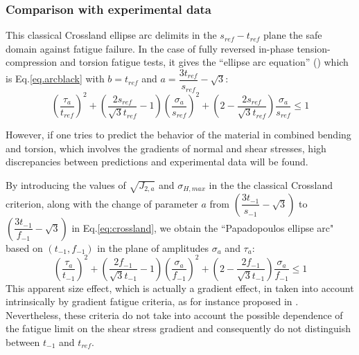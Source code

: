 \subsubsection{Comparison with experimental data}
This classical Crossland ellipse arc delimits in the $s_{ref}-t_{ref}$  plane the safe domain against fatigue failure. In the case of fully reversed in-phase tension-compression and torsion fatigue tests, it gives the ``ellipse arc equation'' (\cite{Papadopoulos1996513}) which is Eq.\eqref{eq.arcblack} with $b=t_{ref}$ and $a=\dfrac{3t_{ref}}{s_{ref}}-\sqrt{3}$:
\begin{equation}
	\left( \dfrac{\tau_a}{t_{ref}}\right) ^2+\left( \dfrac{2s_{ref}}{\sqrt{3}t_{ref}}-1\right) \left( \dfrac{\sigma_a}{s_{ref}}\right) ^2+\left( 2-\dfrac{2s_{ref}}{\sqrt{3}t_{ref}}\right) \dfrac{\sigma_a}{s_{ref}}\leqslant 1
	\label{crossland}
\end{equation}

However, if one tries to predict the behavior of the material in combined bending and torsion, which involves  the gradients of normal and shear stresses, high discrepancies between predictions and experimental data will be found. 

By introducing the values of $\sqrt{J_{2,a}}$ and $\sigma_{H,max}$ in the the classical Crossland criterion, along with the change of parameter $a$  from $\left(\dfrac{3 t_{-1}}{s_{-1}}-\sqrt{3}\right)$ to $\left(\dfrac{3 t_{-1}}{f_{-1}}-\sqrt{3}\right)$ in Eq.\eqref{eq:crossland}, we obtain the ``Papadopoulos ellipse arc" based on $\left(t_{-1},f_{-1} \right) $ in the plane of amplitudes $\sigma_a$ and $\tau_a$:
\begin{equation}
	\left(\dfrac{\tau_a}{t_{-1}}\right)^2+\left(\dfrac{2f_{-1}}{\sqrt{3}t_{-1}}-1\right)\left(\dfrac{\sigma_a}{f_{-1}}\right)^2+\left(2-\dfrac{2f_{-1}}{\sqrt{3}t_{-1}}\right)\dfrac{\sigma_a}{f_{-1}}\leqslant 1
	\label{papa}
\end{equation}
This apparent size effect, which is actually a gradient effect, in taken
into account intrinsically by gradient fatigue criteria, as for instance
proposed in \cite{Papadopoulos1996513}. Nevertheless, these criteria do not take into account the possible dependence of the fatigue limit on the shear
stress gradient and consequently do not distinguish between $t_{-1}$
and $t_{ref}$.


